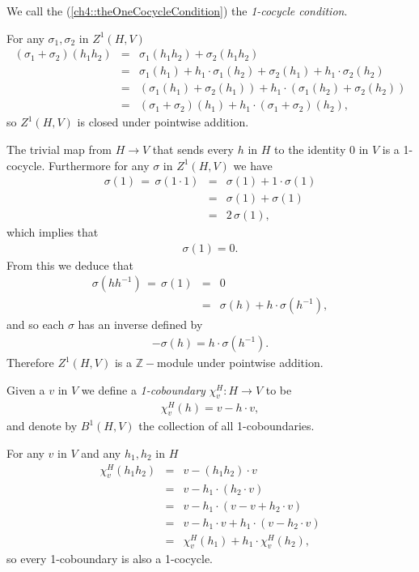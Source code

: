 We call the (\ref{ch4::theOneCocycleCondition}) the \emph{1-cocycle condition}.

For any $\sigma_1, \sigma_2$ in $Z^1\left(H, V\right)$
\begin{eqnarray*}
	\left(\sigma_1 + \sigma_2\right)(h_1h_2) &=& \sigma_1(h_1h_2) +  \sigma_2(h_1h_2) \\
	&=& \sigma_1(h_1) + h_1\cdot\sigma_1(h_2) +  \sigma_2(h_1) + h_1\cdot\sigma_2(h_2)\\
	&=& \left( \sigma_1(h_1) + \sigma_2(h_1) \right) + h_1\cdot\left(\sigma_1(h_2) + \sigma_2(h_2)\right) \\
	&=& \left(\sigma_1+\sigma_2\right)(h_1) + h_1\cdot\left(\sigma_1 + \sigma_2\right)(h_2),
\end{eqnarray*}
so $Z^1(H, V)$ is closed under pointwise addition.

The trivial map from $H \rightarrow V$ that sends every $h$ in $H$ to the identity 0 in $V$ is a 1-cocycle. Furthermore for any $\sigma$ in $Z^1(H, V)$ we have
\begin{eqnarray*}
	\sigma(1)\, =\, \sigma(1\cdot 1) &=& \sigma(1) + 1\cdot \sigma(1) \\
	&=& \sigma(1) + \sigma(1) \\
	&=& 2\,\sigma(1),
\end{eqnarray*}
which implies that
\begin{eqnarray*}
\sigma(1) = 0.
\end{eqnarray*}
From this we deduce that
\begin{eqnarray*}
	\sigma(hh^{-1})\, =\, \sigma(1) &=& 0 \\
	&=& \sigma(h) + h\cdot \sigma(h^{-1}),
\end{eqnarray*}
and so each $\sigma$ has an inverse defined by
\begin{eqnarray*}
	-\sigma(h) = h\cdot\sigma(h^{-1}).
\end{eqnarray*}
Therefore $Z^1\left(H, V\right)$ is a $\mathbb{Z}-$module under pointwise addition.

Given a $v$ in $V$ we define a \emph{1-coboundary} $\chi^H_v:H\rightarrow V$ to be
\begin{eqnarray*}
	\chi^H_v (h) = v - h\cdot v,
\end{eqnarray*}
and denote by $B^1\left(H, V\right)$ the collection of all 1-coboundaries. 

For any $v$ in $V$ and any $h_1, h_2$ in $H$
\begin{eqnarray*}
	\chi^H_v(h_1h_2) &=& v - (h_1h_2)\cdot v \\
	&=& v - h_1 \cdot \left(h_2\cdot v \right)\\
	&=& v - h_1 \cdot \left(v -v + h_2\cdot v \right)\\
	&=& v - h_1\cdot v + h_1\cdot \left( v - h_2\cdot v\right)\\
	&=& \chi^H_v(h_1) + h_1\cdot \chi^H_v(h_2),
\end{eqnarray*}
so every 1-coboundary is also a 1-cocycle. 

